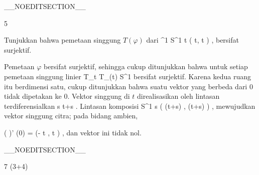 __NOEDITSECTION__

{5}

{

Tunjukkan bahwa pemetaan singgung $T(\varphi)$ dari
\maabbeledisp {\varphi} {\R^1} {S^1
} { t } {( \cos  t, \sin  t  )
} {,}
bersifat surjektif.

}
{

Pemetaan $\varphi$ bersifat surjektif, sehingga cukup ditunjukkan bahwa untuk setiap
 pemetaan singgung linier
\maabbdisp {} {T_t \R \cong \R} { T_{\varphi(t)} S^1
} {}
bersifat surjektif. Karena kedua ruang itu berdimensi satu, cukup ditunjukkan bahwa suatu vektor yang berbeda dari $0$ tidak dipetakan ke $0$. Vektor singgung di $t$ direalisasikan oleh lintasan terdiferensialkan
\maabbeledisp {\gamma} {\R} {\R
} { s } {t+s
} {.}
Lintasan komposisi
\maabbeledisp {\varphi \circ \gamma} {\R} {S^1
} { s } { ( \cos (t+s) , \sin (t+s) )
} {,}
mewujudkan vektor singgung citra; pada bidang ambien,
 {} {}

\mavergleichskettedisp
{\vergleichskette
{( \varphi \circ \gamma)' (0)
}
{ =} {(- \sin t , \cos t )
}
{ } {
}
{ } {
}
{ } {
}
}
{}{}{,}
dan vektor ini tidak nol.

 }

__NOEDITSECTION__

{7 (3+4)}

